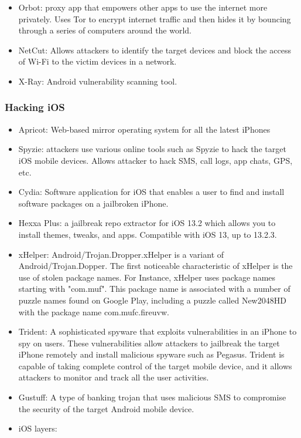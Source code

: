 \begin{itemize}
\begin{itemize}
        \item Orbot: proxy app that empowers other apps to use the internet more privately. Uses Tor to encrypt internet traffic and then hides it by bouncing through a series of computers around the world.
        \item NetCut: Allows attackers to identify the target devices and block the access of Wi-Fi to the victim devices in a network.
        \item X-Ray: Android vulnerability scanning tool.
    \end{itemize}
\end{itemize}
\subsubsection{Hacking iOS}
\begin{itemize}
    \item Apricot: Web-based mirror operating system for all the latest iPhones
    \item Spyzie: attackers use various online tools such as Spyzie to hack the target iOS mobile devices. Allows attacker to hack SMS, call logs, app chats, GPS, etc.
    \item Cydia: Software application for iOS that enables a user to find and install software packages on a jailbroken iPhone.
    \item Hexxa Plus: a jailbreak repo extractor for iOS 13.2 which allows you to install themes, tweaks, and apps. Compatible with iOS 13, up to 13.2.3.
    \item xHelper: Android/Trojan.Dropper.xHelper is a variant of Android/Trojan.Dopper. The first noticeable characteristic of xHelper is the use of stolen package names. For Instance, xHelper uses package names starting with "com.muf". This package name is associated with a number of puzzle names found on Google Play, including a puzzle called New2048HD with the package name com.mufc.fireuvw.
    \item Trident: A sophisticated spyware that exploits vulnerabilities in an iPhone to spy on users. These vulnerabilities allow attackers to jailbreak the target iPhone remotely and install malicious spyware such as Pegasus. Trident is capable of taking complete control of the target mobile device, and it allows attackers to monitor and track all the user activities.
    \item Gustuff: A type of banking trojan that uses malicious SMS to compromise the security of the target Android mobile device.
    \item iOS layers:

\end{itemize}
